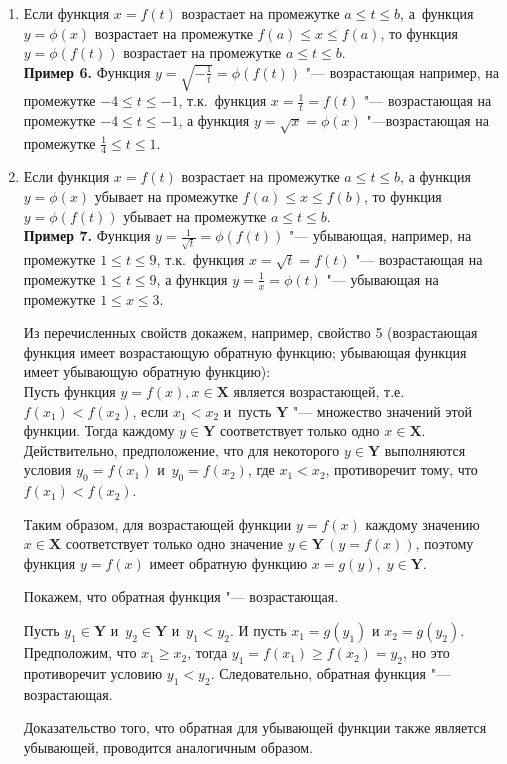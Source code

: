 \begin{enumerate}
\item Если функция $x = f(t)$ возрастает на промежутке
$a \leqslant t \leqslant b$, а~функция $y = \phi(x)$ возрастает
на промежутке $f(a) \leqslant x \leqslant f(a)$,
то функция $y = \phi(f(t))$ возрастает на промежутке
$a \leqslant t \leqslant b$. \\
\textbf{Пример 6.} Функция
$\displaystyle y = \sqrt{-\frac{1}{t}} = \phi(f(t))$ "--- возрастающая
например, на промежутке $-4 \leqslant t \leqslant -1$,
т.к.\ функция $\displaystyle x = \frac{1}{t} = f(t)$ "--- возрастающая
на промежутке $-4 \leqslant t \leqslant -1$,
а функция $y = \sqrt{x} = \phi(x)$ "---возрастающая на промежутке
$\displaystyle \frac{1}{4} \leqslant t \leqslant 1$.

\item Если функция $x = f(t)$  возрастает на промежутке
$a \leqslant t \leqslant b$,
а функция $y = \phi(x)$ убывает на промежутке
$f(a) \leqslant x \leqslant f(b)$, 
то функция $y = \phi(f(t))$ убывает на промежутке
$a \leqslant t \leqslant b$. \\
\textbf{Пример 7.} Функция
$\displaystyle y = \frac{1}{\sqrt{t}} = \phi(f(t))$ "--- убывающая,
например, на промежутке $1 \leqslant t \leqslant 9$,
т.к.\ функция $x = \sqrt{t} = f(t)$ "--- возрастающая на промежутке
$1 \leqslant t \leqslant 9$, а функция
$\displaystyle y = \frac{1}{x} = \phi(t)$
"--- убывающая на промежутке $1 \leqslant x \leqslant 3$.

Из перечисленных свойств докажем, например, свойство 5 (возрастающая
функция имеет возрастающую обратную функцию; убывающая функция имеет
убывающую обратную функцию): \\
Пусть функция $y = f(x), x \in \mathbf{X}$ является возрастающей,
т.е.\ $f(x_{1}) < f(x_{2})$, если $x_{1} < x_{2}$ и~пусть $\mathbf{Y}$
"--- множество значений этой функции. Тогда каждому $y \in \mathbf{Y}$
соответствует только одно $x \in \mathbf{X}$.
Действительно, предположение, что для некоторого $y \in \mathbf{Y}$
выполняются условия $y_{0} = f(x_{1})$ и~$y_{0} = f(x_{2})$,
где $x_{1} < x_{2}$, противоречит тому, что $f(x_{1}) < f(x_{2})$.

Таким образом, для возрастающей функции $y = f(x)$ каждому значению
$x \in \mathbf{X}$ соответствует только одно значение
$y \in \mathbf{Y} \, (y = f(x))$, поэтому функция $y = f(x)$ имеет
обратную функцию $x = g(y), \; y \in \mathbf{Y}$.

Покажем, что обратная функция "--- возрастающая.

Пусть $y_{1} \in \mathbf{Y}$ и~$y_{2} \in \mathbf{Y}$ и~$y_{1} < y_{2}$.
И пусть $x_{1} = g(y_{1})$ и $x_{2} = g(y_{2})$.
Предположим, что $x_{1} \geqslant x_{2}$, тогда
$y_{1} = f(x_{1}) \geqslant f(x_{2}) = y_{2}$, но это противоречит условию
$y_{1} < y_{2}$. Следовательно, обратная функция "--- возрастающая.

Доказательство того, что обратная для убывающей функции также является
убывающей, проводится аналогичным образом.

\end{enumerate}

